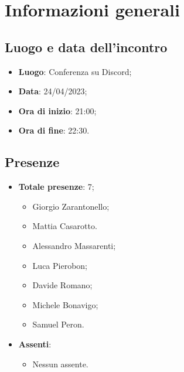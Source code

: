 \section{Informazioni generali}

    \subsection{Luogo e data dell'incontro}
    \begin{itemize}
        \item \textbf{Luogo}: Conferenza su Discord;
        \item \textbf{Data}: 24/04/2023;
        \item \textbf{Ora di inizio}: 21:00;
        \item \textbf{Ora di fine}: 22:30.
    \end{itemize}
    \subsection{Presenze}
    \begin{itemize}
        \item \textbf{Totale presenze}: 7;
        \begin{itemize}
            \item Giorgio Zarantonello;
            \item Mattia Casarotto.
            \item Alessandro Massarenti;
            \item Luca Pierobon;
            \item Davide Romano;
            \item Michele Bonavigo;
            \item Samuel Peron.
        \end{itemize}
        \item \textbf{Assenti}:
        \begin{itemize}
            \item Nessun assente.
        \end{itemize}
    \end{itemize}